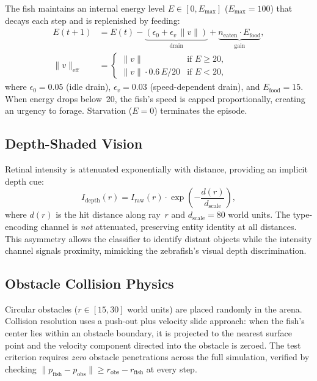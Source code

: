 \documentclass[11pt,a4paper]{article}
\begin{document}
The fish maintains an internal energy level $E \in [0, E_\text{max}]$
($E_\text{max} = 100$) that decays each step and is replenished by feeding:
\begin{equation}\label{eq:energy}
\boxed{
\begin{aligned}
  E(t{+}1) &= E(t) - \underbrace{(\epsilon_0 + \epsilon_v\,\|v\|)}_{\text{drain}}
    + \underbrace{n_\text{eaten}\cdot E_\text{food}}_{\text{gain}}, \\
  \|v\|_\text{eff} &= \begin{cases}
    \|v\| & \text{if } E \geq 20, \\
    \|v\| \cdot 0.6\,E/20 & \text{if } E < 20,
  \end{cases}
\end{aligned}
}
\end{equation}
where $\epsilon_0 = 0.05$ (idle drain), $\epsilon_v = 0.03$ (speed-dependent
drain), and $E_\text{food} = 15$.
When energy drops below~20, the fish's speed is capped proportionally, creating
an urgency to forage.
Starvation ($E = 0$) terminates the episode.

\subsection{Depth-Shaded Vision}

Retinal intensity is attenuated exponentially with distance, providing an
implicit depth cue:
\begin{equation}\label{eq:depth_shading}
  I_\text{depth}(r) = I_\text{raw}(r) \cdot \exp\!\left(-\frac{d(r)}{d_\text{scale}}\right),
\end{equation}
where $d(r)$ is the hit distance along ray~$r$ and $d_\text{scale} = 80$
world units.
The type-encoding channel is \emph{not} attenuated, preserving entity identity
at all distances.
This asymmetry allows the classifier to identify distant objects while the
intensity channel signals proximity, mimicking the zebrafish's visual depth
discrimination.

\subsection{Obstacle Collision Physics}

Circular obstacles ($r \in [15, 30]$ world units) are placed randomly in the
arena.
Collision resolution uses a push-out plus velocity slide approach: when the
fish's center lies within an obstacle boundary, it is projected to the nearest
surface point and the velocity component directed into the obstacle is zeroed.
The test criterion requires \emph{zero} obstacle penetrations across the full
simulation, verified by checking
$\|p_\text{fish} - p_\text{obs}\| \geq r_\text{obs} - r_\text{fish}$
at every step.
\end{document}
